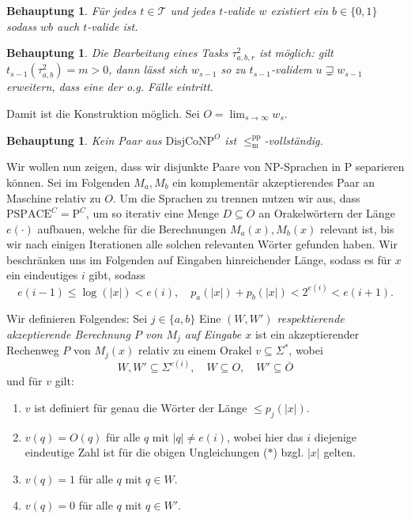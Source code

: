 \documentclass[nofonts]{uebung}
\newtheorem{claim}[theorem]{Behauptung}
\theoremstyle{definition}
\def\P{\ensuremath{\mathrm{P}}}
\def\DisjCoNP{\ensuremath{\mathrm{DisjCoNP}}}
\def\leqmpp{\ensuremath{\leq_\mathrm{m}^\mathrm{pp}}}
\begin{document}
\begin{claim}
    Für jedes $t\in\mathcal T$ und jedes $t$-valide $w$ existiert ein $b\in\{0,1\}$ sodass $wb$ auch $t$-valide ist.
\end{claim}

\begin{claim}
    Die Bearbeitung eines Tasks $\tau^2_{a,b,r}$ ist möglich: gilt $t_{s-1}(\tau^2_{a,b})=m>0$, dann lässt sich $w_{s-1}$ so zu $t_{s-1}$-validem $u\sqsupsetneq w_{s-1}$ erweitern, dass eine der o.g. Fälle eintritt.
\end{claim}

Damit ist die Konstruktion möglich. Sei $O=\lim_{s\to\infty} w_s$.

\begin{claim}
    Kein Paar aus $\DisjCoNP^O$ ist $\leqmpp$-vollständig.
\end{claim}

Wir wollen nun zeigen, dass wir disjunkte Paare von NP-Sprachen in P separieren können. Sei im Folgenden $M_a, M_b$ ein komplementär akzeptierendes Paar an Maschine relativ zu $O$. Um die Sprachen zu trennen nutzen wir aus, dass $\mathrm{PSPACE}^C=\P^C$, um so iterativ eine Menge $D\subseteq O$ an Orakelwörtern der Länge $e(\cdot)$ aufbauen, welche für die Berechnungen $M_a(x), M_b(x)$ relevant ist, bis wir nach einigen Iterationen alle solchen relevanten Wörter gefunden haben. 
Wir beschränken uns im Folgenden auf Eingaben hinreichender Länge, sodass es für $x$ ein eindeutiges $i$ gibt, sodass
\[ e(i-1) \leq \log(|x|) < e(i), \quad p_a(|x|)+p_b(|x|)< 2^{e(i)} < e(i+1).\tag{\ast} \]

Wir definieren Folgendes: %
Sei $j\in \{a,b\}$
Eine \emph{$(W, W')$ respektierende akzeptierende Berechnung $P$ von $M_j$ auf Eingabe $x$} ist ein akzeptierender Rechenweg $P$ von $M_j(x)$ relativ zu einem Orakel $v\subseteq\Sigma^*$, wobei 
\[ W,W'\subseteq \Sigma^{e(i)}, \quad W\subseteq O, \quad W'\subseteq\overline{O} \]
und für $v$ gilt:
\begin{enumerate}[noitemsep,label=\arabic*.]
    \item $v$ ist definiert für genau die Wörter der Länge $\leq p_j(|x|)$.
    \item $v(q)=O(q)$ für alle $q$ mit $|q|\neq  e(i)$, wobei hier das $i$ diejenige eindeutige Zahl ist für die obigen Ungleichungen ($\ast$) bzgl. $|x|$ gelten.
    \item $v(q)=1$ für alle $q$ mit $q\in W$.
    \item $v(q)=0$ für alle $q$ mit $q\in W'$.
\end{enumerate}
\end{document}
